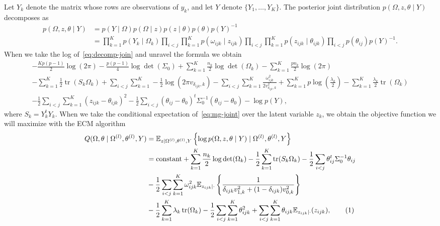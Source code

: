 \documentclass[a4paper, 11pt, oneside]{report}
\DeclareMathOperator{\tr}{tr}
\newcommand{\E}{\mathbb{E}}
\newcommand{\1}{\mathds{1}}
\newcommand{\powl}{^{(l)}}
\newcommand{\inv}{^{-1}}
\begin{document}
Let $Y_k$ denote the matrix whose rows are observations of $y_k$, and let $Y$
denote $\{Y_1,\dots,Y_K\}$.
The posterior joint distribution $p(\Omega,  z, \theta \mid Y)$ decomposes as
\begin{align}\label{eq:decomp-join}
	p(\Omega,  z, \theta \mid Y) & = p(Y \mid \Omega) p(\Omega \mid z)
	p(z \mid \theta) p(\theta) p(Y)\inv \nonumber                       \\
	                             & = \prod_{k=1}^K p(Y_k \mid \Omega_k)
	\prod_{i < j}\prod_{k=1}^K p(\omega_{ijk}
	\mid z_{ijk}) \prod_{i < j}\prod_{k=1}^K
	p(z_{ijk} \mid \theta_{ijk})\prod_{i <
		j} p(\theta_{ij}) p(Y)\inv.
\end{align}
When we take the log of~\eqref{eq:decomp-join} and unravel the formula we obtain
\begin{multline}\label{eq:mg-joint}
	- \frac{Kp(p-1)}{2} \log(2\pi) - \frac{p(p-1)}{4} \log\det(\Sigma_0) + \sum_{k=1}^K \frac{n_k}{2} \log\det(\Omega_k) - \sum_{k=1}^K \frac{p n_k}{2} \log(2 \pi)  \\
	-\sum_{k=1}^K\frac{1}{2} \tr(S_k \Omega_k) + \sum_{i < j}\sum_{k=1}^K -\frac{1}{2} \log(2 \pi v_{\delta_{ijk}, k}) - \sum_{i < j} \sum_{k=1}^K\frac{\omega_{ijk}^2}{2 v_{\delta_{ijk}, k}^2} + \sum_{k=1}^K p \log\left(\frac{\lambda_k}{2}\right) - \sum_{k=1}^K \frac{\lambda_k}{2} \tr(\Omega_k)  \\
	-\frac{1}{2} \sum_{i < j}\sum_{k=1}^K (z_{ijk} - \theta_{ijk})^2  -\frac{1}{2} \sum_{i < j} (\theta_{ij} - \theta_0)^t \Sigma_0\inv (\theta_{ij} - \theta_0) - \log p(Y),
\end{multline}
where $S_k = Y_k^t Y_k$.
When we take the conditional expectation of~\eqref{eq:mg-joint} over the latent
variable $z_k$, we obtain the objective function we will maximize with the ECM algorithm
\begin{align*}
	Q(\Omega, \theta \mid \Omega\powl, \theta\powl, Y) & = \E_{z \mid \Omega\powl, \theta\powl, Y} \left\{\log p(\Omega,  z, \theta \mid Y) \mid \Omega\powl, \theta\powl, Y\right\}                                                                                                                      \\
	                                                   & = \text{constant} + \sum_{k=1}^K \frac{n_k}{2} \log \det(\Omega_k) - \frac{1}{2} \sum_{k=1}^K \tr(S_k \Omega_k) - \frac{1}{2} \sum_{i < j} \theta_{ij}^t \Sigma_0\inv \theta_{ij}                                                                \\
	                                                   & - \frac{1}{2} \sum_{i < j} \sum_{k=1}^K \omega_{ijk}^2 \E_{z_{ijk} \mid \cdot} \left\{\frac{1}{\delta_{ijk} v_{1,k}^2 + (1 - \delta_{ijk}) v_{0,k}^2}\right\}                                                                                    \\
	                                                   & - \frac{1}{2} \sum_{k=1}^K \lambda_k \tr(\Omega_k)  -\frac{1}{2} \sum_{i < j} \sum_{k = 1}^K \theta_{ijk}^2 + \sum_{i < j} \sum_{k=1}^K \theta_{ijk} \E_{z_{ijk} \mid \cdot}(z_{ijk}) ,\stepcounter{equation}\tag{\theequation}\label{eq:mg-exp}
\end{align*}
\end{document}
